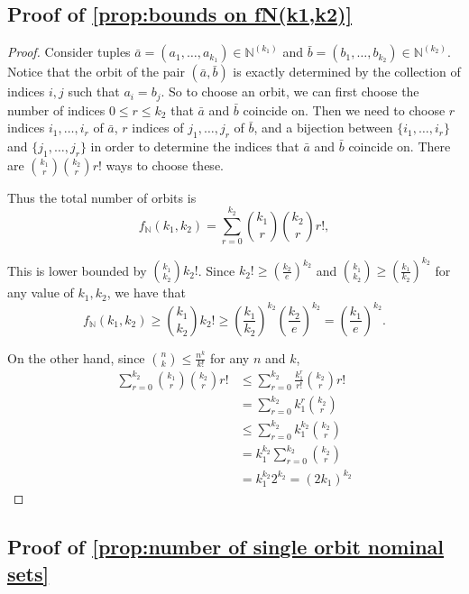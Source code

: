 \documentclass[runningheads]{llncs}
\newcommand{\bb}{\mathbb}
\begin{document}
\subsection{Proof of \autoref{prop:bounds on fN(k1,k2)}} \label{appendix:proof of bounds on fN(k1,k2)}

\begin{proof}
    Consider tuples $\bar a = (a_1, \ldots, a_{k_1}) \in \bb N^{(k_1)}$ and $\bar b = (b_1, \ldots, b_{k_2}) \in \bb N^{(k_2)}$. 
    Notice that the orbit of the pair $(\bar a, \bar b)$ is exactly determined by the collection of indices $i,j$ such that $a_i = b_j$.
    So to choose an orbit, we can first choose the number of indices $0 \leq r \leq k_2$ that $\bar a$ and $\bar b$ coincide on.
    Then we need to choose $r$ indices $i_1, \ldots, i_r$ of $\bar a$, $r$ indices of $j_1, \ldots, j_r$ of $\bar b$, and a bijection between $\{i_1, \ldots, i_r\}$ and $\{j_1, \ldots, j_r\}$ in order to determine the indices that $\bar a$ and $\bar b$ coincide on. 
    There are $\binom{k_1}{r}\binom{k_2}{r}r!$ ways to choose these. 
    
    Thus the total number of orbits is 
    \[
    f_{\bb N}(k_1, k_2) = \sum_{r=0}^{k_2} \binom{k_1}{r}\binom{k_2}{r}r!,
    \]

    This is lower bounded by $\binom{k_1}{k_2} k_2!$.
    Since $k_2! \geq \left(\frac{k_2}{e}\right)^{k_2}$ and $\binom{k_1}{k_2} \geq \left(\frac{k_1}{k_2}\right)^{k_2}$ for any value of $k_1, k_2$, we have that
    \[
        f_{\bb N}(k_1, k_2) \geq \binom{k_1}{k_2} k_2! \geq \left(\frac{k_1}{k_2}\right)^{k_2} \left(\frac{k_2}{e}\right)^{k_2} = \left(\frac{k_1}{e}\right)^{k_2}.
    \]

    On the other hand, since $\binom{n}{k} \leq \frac{n^k}{k!}$ for any $n$ and $k$,
    \begin{align*}
        \sum_{r=0}^{k_2} \binom{k_1}{r}\binom{k_2}{r}r! &\leq \sum_{r=0}^{k_2} \frac{k_1^r}{r!} \binom{k_2}{r} r! \\
        &= \sum_{r=0}^{k_2} k_1^r \binom{k_2}{r} \\
        &\leq \sum_{r=0}^{k_2} k_1^{k_2} \binom{k_2}{r} \\
        &= k_1^{k_2} \sum_{r=0}^{k_2} \binom{k_2}{r} \\
        &= k_1^{k_2} 2^{k_2} = (2k_1)^{k_2}
    \end{align*}
\end{proof}



\subsection{Proof of \autoref{prop:number of single orbit nominal sets}} \label{appendix:proof of number of single orbit nominal sets}
\end{document}
